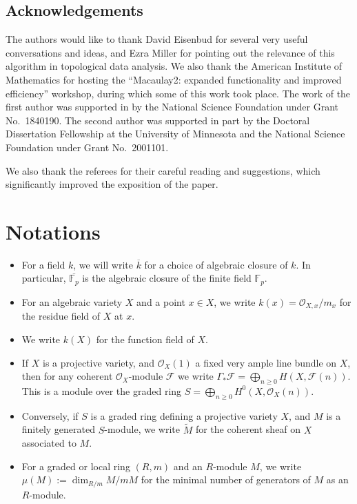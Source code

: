 \documentclass[12pt]{article}
\let\wtilde\widetilde
\def\cF{\mathcal F}
\def\OO{\mathcal O}
\def\FF{\mathbb F}
\theoremstyle{theorem}
\numberwithin{thm}{section}
\theoremstyle{definition}
\begin{document}
\subsection*{Acknowledgements}
The authors would like to thank David Eisenbud for several very useful conversations and ideas, and Ezra Miller for pointing out the relevance of this algorithm in topological data analysis.
We also thank the American Institute of Mathematics for hosting the ``Macaulay2: expanded functionality and improved efficiency'' workshop, during which some of this work took place.
The work of the first author was supported in by the National Science Foundation under Grant No.~1840190.
The second author was supported in part by the Doctoral Dissertation Fellowship at the University of Minnesota and the National Science Foundation under Grant No.~2001101.

We also thank the referees for their careful reading and suggestions, which significantly improved the exposition of the paper.


\section{Notations}

\begin{itemize}
\item For a field $k$, we will write $\overline k$ for a choice of algebraic closure of $k$. In particular, $\overline{\FF_p}$ is the algebraic closure of the finite field $\FF_p$.
\item For an algebraic variety $X$ and a point $x\in X$, we write $k(x)=\OO_{X,x}/m_x$ for the residue field of $X$ at $x$.
\item We write $k(X)$ for the function field of $X$.
\item If $X$ is a projective variety, and $\OO_X(1)$ a fixed very ample line bundle on $X$, then for any coherent $\OO_X$-module $\cF$ we write
$\Gamma_* \cF = \bigoplus_{n\geq 0} H(X,\cF(n))$. This is a module over the graded ring $S=\bigoplus_{n\geq 0} H^0(X,\OO_X(n))$.
\item Conversely, if $S$ is a graded ring defining a projective variety $X$, and $M$ is a finitely generated $S$-module, we write $\wtilde M$ for the coherent sheaf on $X$ associated to $M$.
\item For a graded or local ring $(R,m)$ and an $R$-module $M$, we write $\mu(M):=\dim_{R/m} M/mM$ for the minimal number of generators of $M$ as an $R$-module.
\end{itemize}
\end{document}

